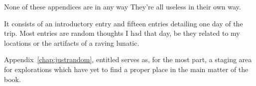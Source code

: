 \documentclass[../butidigress.tex]{subfiles}
\begin{document}
None of these appendices are in any way 
They're all useless in their own way.

It consists of an introductory entry and fifteen entries detailing one day of the trip.
Most entries are random thoughts I had that day, be they related to my locations or the artifacts of a raving lunatic.

Appendix~\ref{chap:justrandom}, entitled  serves as, for the most part, a staging area for explorations which have yet to find a proper place in the main matter of the book.

% 












\end{document}
